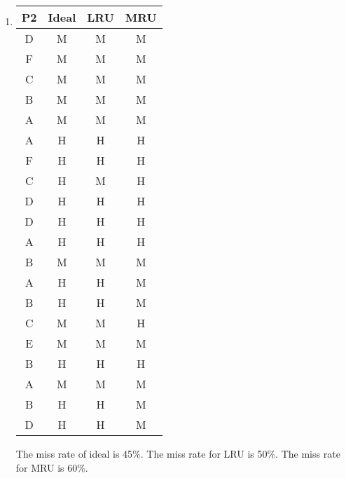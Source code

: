 \documentclass{article}
\begin{document}
\begin{enumerate}
    \item \begin{tabular}{|c|c|c|c|}
    \hline
    P2 & Ideal & LRU & MRU \\
    \hline
    D & M & M & M \\
    \hline
    F & M & M & M \\
    \hline
    C & M & M & M \\
    \hline
    B & M & M & M \\
    \hline
    A & M & M & M \\
    \hline
    A & H & H & H \\
    \hline
    F & H & H & H \\
    \hline
    C & H & M & H \\
    \hline
    D & H & H & H \\
    \hline
    D & H & H & H \\
    \hline
    A & H & H & H \\
    \hline
    B & M & M & M \\
    \hline
    A & H & H & M \\
    \hline
    B & H & H & M \\
    \hline
    C & M & M & H \\
    \hline
    E & M & M & M \\
    \hline
    B & H & H & H \\
    \hline
    A & M & M & M \\
    \hline
    B & H & H & M \\
    \hline
    D & H & H & M \\
    \hline
    \end{tabular}
    The miss rate of ideal is 45\%. The miss rate for LRU is 50\%. The miss rate for MRU is 60\%.
    \end{enumerate}
\end{document}
